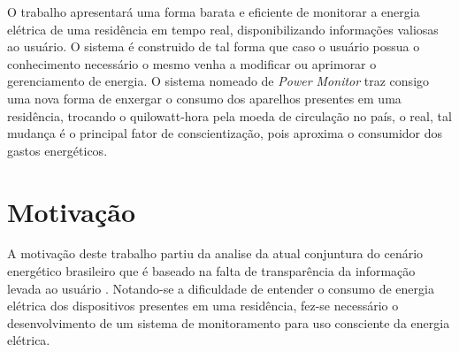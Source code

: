 
O trabalho apresentará uma forma barata e eficiente de monitorar a energia elétrica de uma residência em tempo real, disponibilizando informações valiosas ao usuário.
O sistema é construido de tal forma que 
caso o usuário possua o conhecimento necessário o mesmo venha a modificar ou aprimorar o gerenciamento de energia. O sistema nomeado de \textit{Power Monitor}
traz consigo uma nova forma de enxergar o consumo dos aparelhos presentes em uma residência, trocando o quilowatt-hora pela moeda de circulação no país,
o real, tal mudança é o principal fator de conscientização, pois aproxima o consumidor dos gastos energéticos.


\section{Motivação}

A motivação deste trabalho partiu da analise da atual conjuntura do cenário energético brasileiro que é baseado na falta de transparência da 
informação levada ao usuário \cite{ref-conju}. Notando-se a dificuldade de entender o consumo de energia elétrica dos dispositivos presentes em uma 
residência, fez-se necessário o desenvolvimento de um sistema de monitoramento para uso consciente da energia elétrica.

